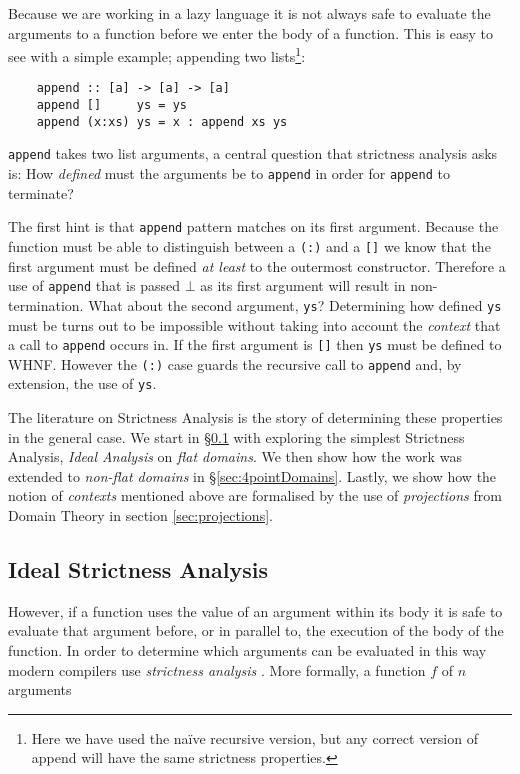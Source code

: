 Because we are working in a lazy language it is not always safe to evaluate the
arguments to a function before we enter the body of a function. This is easy
to see with a simple example; appending two lists\footnote{Here we have used
the na\"{i}ve recursive version, but any correct version of append will
have the same strictness properties.}:

\begin{verbatim}
    append :: [a] -> [a] -> [a]
    append []     ys = ys
    append (x:xs) ys = x : append xs ys
\end{verbatim}

\verb|append| takes two list arguments, a central question that strictness
analysis asks is: How \emph{defined} must the arguments be to \verb|append|
in order for \verb|append| to terminate?

The first hint is that \verb|append| pattern matches on its first argument.
Because the function must be able to distinguish between a \verb|(:)| and a
\verb|[]| we know that the first argument must be defined \emph{at least} to
the outermost constructor. Therefore a use of \verb|append| that is passed
$\bot$ as its first argument will result in non-termination. What about the
second argument, \verb|ys|? Determining how defined \verb|ys| must be turns
out to be impossible without taking into account the \emph{context} that
a call to \verb|append| occurs in. If the first argument is \verb|[]|
then \verb|ys| must be defined to WHNF. However the \verb|(:)| case
guards the recursive call to \verb|append| and, by extension, the use
of \verb|ys|.

The literature on Strictness Analysis is the story of determining these
properties in the general case. We start in \S \ref{sec:idealAnalysis} with
exploring the simplest Strictness Analysis, \emph{Ideal Analysis} on \emph{flat
domains}. We then show how the work was extended to \emph{non-flat domains} in
\S \ref{sec:4pointDomains}. Lastly, we show how the notion of \emph{contexts}
mentioned above are formalised by the use of \emph{projections} from Domain
Theory in section \ref{sec:projections}.


\subsection{Ideal Strictness Analysis}
\label{sec:idealAnalysis}

However, if a function uses the value of an argument within its body it is safe
to evaluate that argument before, or in parallel to, the execution of the body
of the function. In order to determine which arguments can be evaluated in this
way modern compilers use \emph{strictness analysis} \citep{mycroft1980theory}.
More formally, a function $f$ of $n$ arguments

